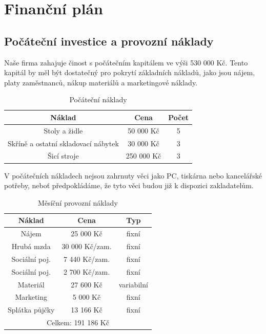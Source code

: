 \documentclass[12pt, a4paper]{article}
\begin{document}
\section{Finanční plán}

\subsection{Počáteční investice a provozní náklady}

Naše firma zahajuje činost s počátečním kapitálem ve výši 530 000 Kč.
Tento kapitál by měl být dostatečný pro pokrytí základních nákladů,
jako jsou nájem, platy zaměstnanců, nákup materiálů a marketingové náklady.

\pagebreak

\begin{table}[h]
  \centering
  \begin{tabular}{ | c | c | c | }
    \hline
    \textbf{Náklad} & \textbf{Cena} & \textbf{Počet} \\
    \hline \hline
    Stoly a židle & 50 000 Kč & 5 \\
    \hline
    Skříně a ostatní skladovací nábytek & 30 000 Kč & 3 \\
    \hline
    Šicí stroje & 250 000 Kč & 3 \\
    \hline
  \end{tabular}
  \caption{Počáteční náklady}
\end{table}

\noindent V počátečních nákladech nejsou zahrnuty věci jako PC, tiskárna nebo kancelářské potřeby, neboť
předpokládáme, že tyto věci budou již k dispozici zakladatelům.

\begin{table}[h]
  \centering
  \begin{tabular}{ | c | c | c | }
    \hline
    \textbf{Náklad} & \textbf{Cena} & \textbf{Typ} \\
    \hline \hline
    Nájem & 25 000 Kč & fixní \\
    \hline
    Hrubá mzda & 30 000 Kč/zam. & fixní \\
    \hline
    Sociální poj. & 7 440 Kč/zam. & fixní \\
    \hline
    Sociální poj. & 2 700 Kč/zam. & fixní \\
    \hline
    Materiál & 27 600 Kč & variabilní \\
    \hline
    Marketing & 5 000 Kč & fixní \\
    \hline
    Splátka půjčky & 13 166 Kč & fixní \\
    \hline
    \multicolumn{3}{|c|}{Celkem: 191 186 Kč} \tabularnewline %
    \hline
  \end{tabular}
  \caption{Měsíční provozní náklady}
\end{table}
\end{document}
